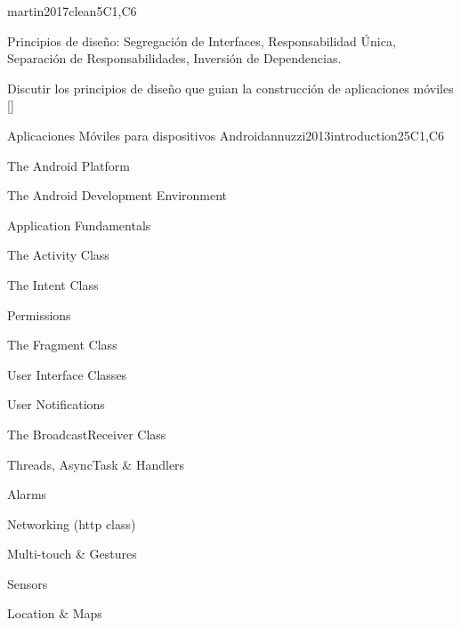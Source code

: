 \begin{syllabus}
\begin{unit}{\PBDMobilePlatforms}{}{martin2017clean}{5}{C1,C6}
\begin{topics}%
    \item \PBDMobilePlatformsTopicMobile
    \item Principios de diseño: Segregación de Interfaces, Responsabilidad  Única, Separación de Responsabilidades, Inversión de Dependencias.
    \item \PBDMobilePlatformsTopicChallenges
    \item \PBDMobilePlatformsTopicLocation
    \item \PBDMobilePlatformsTopicPerformance
    \item \PBDMobilePlatformsTopicMobilePlatform
    \item \PBDMobilePlatformsTopicEmerging
\end{topics}
\begin{learningoutcomes}
    \item \PBDMobilePlatformsLODesignAndMobile [\Familiarity]
    \item \PBDMobilePlatformsLODiscussTheMobile [\Familiarity]
    \item Discutir los principios de diseño que guian la construcción de aplicaciones móviles [\Familiarity]
    \item \PBDMobilePlatformsLODiscussThePower [\Familiarity]
    \item \PBDMobilePlatformsLOCompareAndProgrammingPurpose [\Familiarity]
\end{learningoutcomes}
\end{unit}

\begin{unit}{Aplicaciones Móviles para dispositivos Android}{}{annuzzi2013introduction}{25}{C1,C6}
\begin{topics}
    \item The Android Platform
    \item The Android Development Environment
    \item Application Fundamentals
    \item The Activity Class
    \item The Intent Class
    \item Permissions
    \item The Fragment Class
    \item User Interface Classes
    \item User Notifications
    \item The BroadcastReceiver Class
    \item Threads, AsyncTask \& Handlers
    \item Alarms
    \item Networking (http class)
    \item Multi-touch \& Gestures
    \item Sensors
    \item Location \& Maps
\end{topics}


\end{unit}
\end{syllabus}

